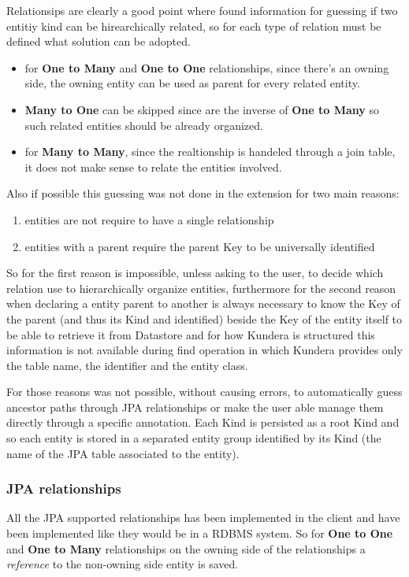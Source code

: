 \newparagraph Relationsips are clearly a good point where found information for guessing if two entitiy kind can be hirearchically related, so for each type of relation must be defined what solution can be adopted.
\begin{itemize}
\item for \textbf{One to Many} and \textbf{One to One} relationships, since there's an owning side, the owning entity can be used as parent for every related entity. 
\item \textbf{Many to One} can be skipped since are the inverse of \textbf{One to Many} so such related entities should be already organized. 
\item for \textbf{Many to Many}, since the realtionship is handeled through a join table, it does not make sense to relate the entities involved.
\end{itemize}

\noindent Also if possible this guessing was not done in the extension for two main reasons:
\begin{enumerate}
\item entities are not require to have a single relationship
\item entities with a parent require the parent Key to be universally identified
\end{enumerate}
So for the first reason is impossible, unless asking to the user, to decide which relation use to hierarchically organize entities, furthermore for the second reason when declaring a entity parent to another is always necessary to know the Key of the parent (and thus its Kind and identified) beside the Key of the entity itself to be able to retrieve it from Datastore and for how Kundera is structured this information is not available during find operation in which Kundera provides only the table name, the identifier and the entity class.

\newparagraph For those reasons was not possible, without causing errors, to automatically guess ancestor paths through JPA relationships or make the user able manage them directly through a specific annotation.
Each Kind is persisted as a root Kind and so each entity is stored in a separated entity group identified by its Kind (the name of the JPA table associated to the entity).

\subsubsection{JPA relationships}
All the JPA supported relationships \cite{book:projpa2} has been implemented in the client and  have been implemented like they would be in a RDBMS system.
So for \textbf{One to One} and \textbf{One to Many} relationships on the owning side of the relationships a \textit{reference} to the non-owning side entity is saved.

